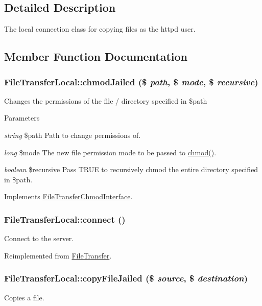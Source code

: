 \subsection{Detailed Description}
The local connection class for copying files as the httpd user. 

\subsection{Member Function Documentation}
\hypertarget{classFileTransferLocal_a37439f6a788a20b31230cb5205d0272a}{
\subsubsection[{chmodJailed}]{\setlength{\rightskip}{0pt plus 5cm}FileTransferLocal::chmodJailed (\$ {\em path}, \/  \$ {\em mode}, \/  \$ {\em recursive})}}
\label{classFileTransferLocal_a37439f6a788a20b31230cb5205d0272a}
Changes the permissions of the file / directory specified in \$path


\begin{DoxyParams}{Parameters}
\item[{\em string}]\$path Path to change permissions of. \item[{\em long}]\$mode The new file permission mode to be passed to \hyperlink{classFileTransfer_a7c49554b3cce3ab7cc03e2f45f9934b1}{chmod()}. \item[{\em boolean}]\$recursive Pass TRUE to recursively chmod the entire directory specified in \$path. \end{DoxyParams}


Implements \hyperlink{interfaceFileTransferChmodInterface_a031e451823be199251562369d1f760f0}{FileTransferChmodInterface}.\hypertarget{classFileTransferLocal_a676f0b89d8271d716a05cd92b55dfa60}{
\subsubsection[{connect}]{\setlength{\rightskip}{0pt plus 5cm}FileTransferLocal::connect ()}}
\label{classFileTransferLocal_a676f0b89d8271d716a05cd92b55dfa60}
Connect to the server. 

Reimplemented from \hyperlink{classFileTransfer_a78b9b9fdd3029295f73a5a41e052e311}{FileTransfer}.\hypertarget{classFileTransferLocal_accbfe365fe1b9f912eaff9f4b3988de0}{
\subsubsection[{copyFileJailed}]{\setlength{\rightskip}{0pt plus 5cm}FileTransferLocal::copyFileJailed (\$ {\em source}, \/  \$ {\em destination})}}
\label{classFileTransferLocal_accbfe365fe1b9f912eaff9f4b3988de0}
Copies a file.


